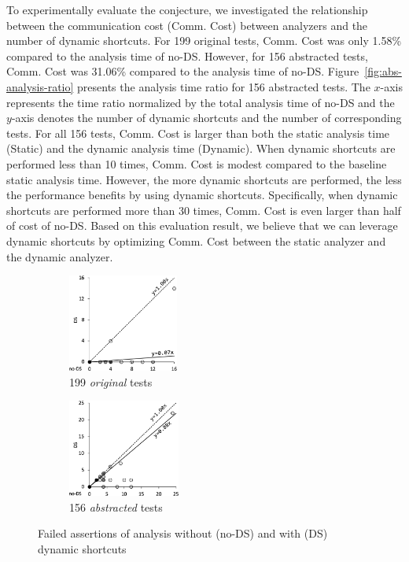 To experimentally evaluate the conjecture, we investigated the relationship between
the communication cost (Comm. Cost) between analyzers and the number of dynamic shortcuts.
For 199 original tests, Comm. Cost was only
1.58\% compared to the analysis time of no-DS.  However, for 156
abstracted tests, Comm. Cost was 31.06\% compared to the analysis
time of no-DS.  Figure~\ref{fig:abs-analysis-ratio} presents the
analysis time ratio for 156 abstracted tests.
The $x$-axis represents the time ratio normalized by the total analysis time of
no-DS and the $y$-axis denotes the number of dynamic
shortcuts and the number of corresponding tests.
For all 156 tests, Comm. Cost is larger than
both the static analysis time (Static) and the dynamic analysis
time (Dynamic).  When dynamic shortcuts are performed less than 10 times,
Comm. Cost is modest compared to the baseline static
analysis time.  However, the more dynamic shortcuts are performed,
the less the performance benefits by using dynamic shortcuts.
Specifically, when dynamic shortcuts are performed more than 30 times,
Comm. Cost is even larger than half of cost of no-DS.
Based on this evaluation result, we believe that we can leverage
dynamic shortcuts by optimizing Comm. Cost between
the static analyzer and the dynamic analyzer.

\begin{figure}[t]
  \centering
  \begin{subfigure}[t]{0.23\textwidth}
    \includegraphics[height=3.2cm]{img/conc-precision}
    \vspace*{-0.7em}
    \caption{199 \textit{original} tests}
    \label{fig:conc-precision}
  \end{subfigure}
  \begin{subfigure}[t]{0.23\textwidth}
    \includegraphics[height=3.2cm]{img/abs-precision}
    \vspace*{-0.7em}
    \caption{156 \textit{abstracted} tests}
    \label{fig:abs-precision}
  \end{subfigure}
  \vspace*{-1em}
  \caption{Failed assertions of analysis without (no-DS) and with (DS) dynamic shortcuts}
  \label{fig:precision}
  \vspace*{-1.5em}
\end{figure}


